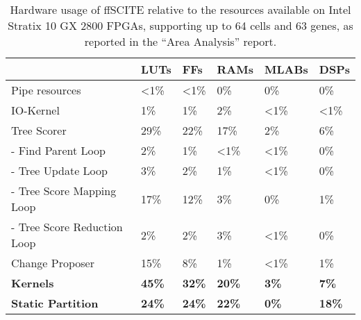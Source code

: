 \begin{table}
    \centering
    \begin{tabular}{l|l|l|l|l|l}
        &                               \textbf{LUTs}&  \textbf{FFs} &  \textbf{RAMs} & \textbf{MLABs} &    \textbf{DSPs} \\
        \hline
        Pipe resources &                <1\% &          <1\% &          0\% &           0\% &               0\%	\\
        IO-Kernel &                     1\% &           1\% &           2\% &           <1\% &              <1\% \\
        Tree Scorer &                   29\% &          22\% &          17\% &          2\% &               6\% \\
        - Find Parent Loop &            2\% &           1\% &           <1\% &          <1\% &              0\% \\
        - Tree Update Loop &            3\% &           2\% &           1\% &           <1\% &              0\% \\
        - Tree Score Mapping Loop &     17\% &          12\% &          3\% &           0\% &               1\% \\
        - Tree Score Reduction Loop&    2\% &           2\% &           3\% &           <1\% &              0\% \\
        Change Proposer &               15\% &          8\% &           1\% &           <1\% &              1\% \\
        \hline
        \textbf{Kernels} &              \textbf{45\%} & \textbf{32\%} & \textbf{20\%} & \textbf{3\%} &      \textbf{7\%} \\
        \textbf{Static Partition} &     \textbf{24\%}&  \textbf{24\%} & \textbf{22\%} & \textbf{0\%} &      \textbf{18\%}	
    \end{tabular}
    \caption{Hardware usage of \ac{ffSCITE} relative to the resources available on Intel Stratix 10 GX 2800 \acp{FPGA}, supporting up to 64 cells and 63 genes, as reported in the ``Area Analysis'' report.}
    \label{tab:rel-usage}
\end{table}

